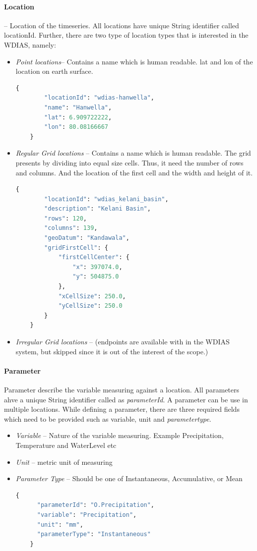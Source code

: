 \paragraph{Location}-- Location of the timeseries. All locations have unique String identifier called locationId. Further, there are two type of location types that is interested in the WDIAS, namely:
\begin{itemize}
  \item \emph{Point locations}-- Contains a name which is human readable. lat and lon of the location on earth surface.
  \begin{lstlisting}[language=Python]
    {
        "locationId": "wdias-hanwella",
        "name": "Hanwella",
        "lat": 6.909722222,
        "lon": 80.08166667
    }
  \end{lstlisting}
  
  \item \emph{Regular Grid locations} -- Contains a name which is human readable. The grid presents by dividing into equal size cells. Thus, it need the number of rows and columns. 
  And the location of the first cell and the width and height of it.
  \begin{lstlisting}[language=Python]
      {
        "locationId": "wdias_kelani_basin",
        "description": "Kelani Basin",
        "rows": 120,
        "columns": 139,
        "geoDatum": "Kandawala",
        "gridFirstCell": {
            "firstCellCenter": {
                "x": 397074.0,
                "y": 504875.0
            },
            "xCellSize": 250.0,
            "yCellSize": 250.0
        }
    }
  \end{lstlisting}
  \item \emph{Irregular Grid locations} -- (endpoints are available with in the WDIAS system, but skipped since it is out of the interest of the scope.)
\end{itemize}

\paragraph{Parameter}
Parameter describe the variable measuring against a location. All parameters ahve a unique String identifier called as \textit{parameterId}. A parameter can be use in multiple locations.
While defining a parameter, there are three required fields which need to be provided such as variable, unit and \textit{parametertype}.
\begin{itemize}  
  \item \emph{Variable} -- Nature of the variable measuring. Example Precipitation, Temperature and WaterLevel etc
  \item \emph{Unit} -- metric unit of measuring
  \item \emph{Parameter Type} -- Should be one of Instantaneous, Accumulative, or Mean
  \begin{lstlisting}[language=Python]
    {
      "parameterId": "O.Precipitation",
      "variable": "Precipitation",
      "unit": "mm",
      "parameterType": "Instantaneous"
    }
  \end{lstlisting}
\end{itemize}


